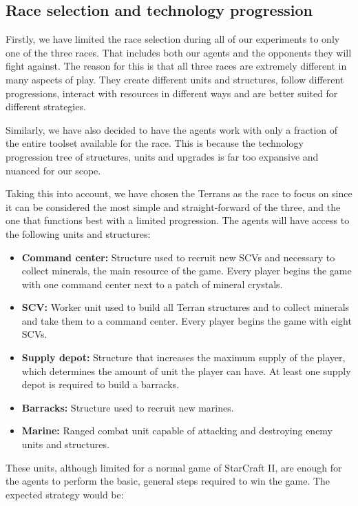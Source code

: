 \subsection{Race selection and technology progression}

Firstly, we have limited the race selection during all of our experiments to only one of the three races. That includes both our agents and the opponents they will fight against. The reason for this is that all three races are extremely different in many aspects of play. They create different units and structures, follow different progressions, interact with resources in different ways and are better suited for different strategies.

Similarly, we have also decided to have the agents work with only a fraction of the entire toolset available for the race. This is because the technology progression tree of structures, units and upgrades is far too expansive and nuanced for our scope.

Taking this into account, we have chosen the Terrans as the race to focus on since it can be considered the most simple and straight-forward of the three, and the one that functions best with a limited progression. The agents will have access to the following units and structures:

\begin{itemize}
    \item \textbf{Command center:} Structure used to recruit new SCVs and necessary to collect minerals, the main resource of the game. Every player begins the game with one command center next to a patch of mineral crystals.
    \item \textbf{SCV:} Worker unit used to build all Terran structures and to collect minerals and take them to a command center. Every player begins the game with eight SCVs.
    \item \textbf{Supply depot:} Structure that increases the maximum supply of the player, which determines the amount of unit the player can have. At least one supply depot is required to build a barracks.
    \item \textbf{Barracks:} Structure used to recruit new marines.
    \item \textbf{Marine:} Ranged combat unit capable of attacking and destroying enemy units and structures.
\end{itemize}

These units, although limited for a normal game of StarCraft II, are enough for the agents to perform the basic, general steps required to win the game. The expected strategy would be:

